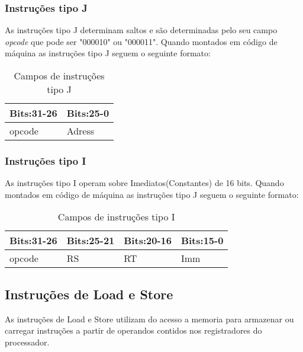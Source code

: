 \documentclass{report}
\begin{document}
\subsubsection{Instruções tipo J}

As instruções tipo J determinam saltos e são determinadas pelo seu campo \textit{opcode} que pode ser "000010" ou "000011".
Quando montados em código de máquina as instruções tipo J seguem o seguinte formato:

\FloatBarrier
    \begin{table}[H]
      \begin{center}
        \begin{tabular}[pos]{|m{2.25cm} | m{9.75cm}|} 
          \hline
          \cellcolor[gray]{0.9}\textbf{Bits:31-26} & \cellcolor[gray]{0.9}\textbf{Bits:25-0} \\ \hline
              opcode  & Adress \\ \hline
        \end{tabular}
        \caption{Campos de instruções tipo J}
		\label{table:camposJ}
      \end{center}
    \end{table}

\subsubsection{Instruções tipo I}

As instruções tipo I operam sobre Imediatos(Constantes) de 16 bits.
Quando montados em código de máquina as instruções tipo J seguem o seguinte formato:

\FloatBarrier
    \begin{table}[H]
      \begin{center}
        \begin{tabular}[pos]{|m{2.25cm} |m{1.875cm} |m{1.875cm} | m{6cm}|} 
          \hline
          \cellcolor[gray]{0.9}\textbf{Bits:31-26} &\cellcolor[gray]{0.9}\textbf{Bits:25-21} &\cellcolor[gray]{0.9}\textbf{Bits:20-16} & \cellcolor[gray]{0.9}\textbf{Bits:15-0} \\ \hline
              opcode  & RS &RT & Imm \\ \hline
        \end{tabular}
        \caption{Campos de instruções tipo I}
		\label{table:camposI}
      \end{center}
    \end{table}



  \subsection{Instruções de Load e Store}
  As instruções de Load e Store utilizam do acesso a memoria para armazenar ou carregar instruções a partir de operandos contidos nos registradores do processador.
  
\end{document}
